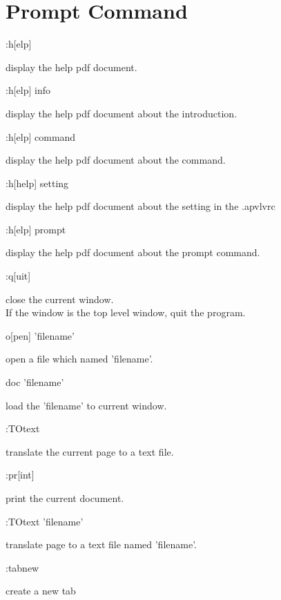 \documentclass[a4paper,12pt]{article}
\begin{document}
\newpage

\section{Prompt Command}

\begin{description}

\item :h[elp]

display the help pdf document.

\item :h[elp] info

display the help pdf document about the introduction.

\item :h[elp] command

display the help pdf document about the command.

\item :h[help] setting

display the help pdf document about the setting in the .apvlvrc

\item :h[elp] prompt

display the help pdf document about the prompt command.

\item :q[uit]

close the current window.\\
If the window is the top level window, quit the program.

\item o[pen] 'filename'

open a file which named 'filename'.

\item doc 'filename'

load the 'filename' to current window.

\item :TOtext

translate the current page to a text file.

\item :pr[int]

print the current document.

\item :TOtext 'filename'

translate page to a text file named 'filename'.

\item :tabnew

create a new tab


\end{description}
\end{document}
